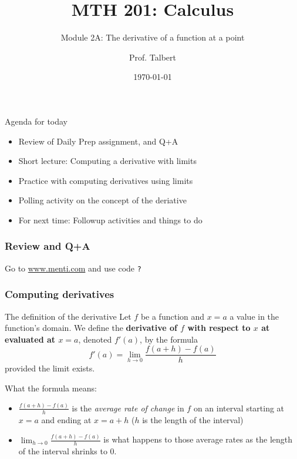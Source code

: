 \documentclass{beamer}
\title{MTH 201: Calculus}
\subtitle{Module 2A: The derivative of a function at a point}
\author{Prof. Talbert}
\institute{GVSU}
\date{\today}
\begin{document}
\frame{\titlepage}

\begin{frame}{Agenda for today}
    \begin{itemize}
        \item<1-> Review of Daily Prep assignment, and Q+A
        \item<2-> Short lecture: Computing a derivative with limits  
        \item<3-> Practice with computing derivatives using limits 
        \item<4-> Polling activity on the concept of the deriative 
        \item<5-> For next time: Followup activities and things to do 
    \end{itemize}
\end{frame}

\begin{frame}
    \frametitle{Review and Q+A}

    \begin{center}
        Go to \url{www.menti.com} and use code \texttt{?}
    \end{center}

\end{frame}

\begin{frame}
    \frametitle{Computing derivatives}

    \begin{alertblock}{The definition of the derivative}
        Let $f$ be a function and $x=a$ a value in the function's domain. We define the \textbf{derivative of $f$ with respect to $x$ at evaluated at $x=a$}, denoted $f'(a)$, by the formula
        $$f'(a) = \lim_{h \to 0} \frac{f(a+h) - f(a)}{h}$$
        provided the limit exists. 
    \end{alertblock}

    What the formula means: 
    \begin{itemize}
        \item $\frac{f(a+h) - f(a)}{h}$ is the \emph{average rate of change} in $f$ on an interval starting at $x = a$ and ending at $x = a + h$ ($h$ is the length of the interval)
        \item $\lim_{h \to 0} \frac{f(a+h) - f(a)}{h}$ is what happens to those average rates as the length of the interval shrinks to 0. 
    \end{itemize}

\end{frame}
\end{document}
